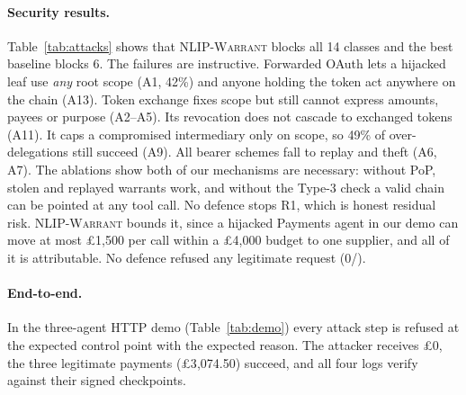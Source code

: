 \documentclass[sigconf,nonacm]{acmart}
\newcommand{\sys}{\textsc{NLIP-Warrant}}
\begin{document}
\paragraph{Security results.} Table~\ref{tab:attacks} shows that \sys{} blocks all 14 classes and the best baseline blocks 6. The failures are instructive. Forwarded OAuth lets a hijacked leaf use \emph{any} root scope (A1, 42\%) and anyone holding the token act anywhere on the chain (A13). Token exchange fixes scope but still cannot express amounts, payees or purpose (A2--A5). Its revocation does not cascade to exchanged tokens (A11). It caps a compromised intermediary only on scope, so 49\% of over-delegations still succeed (A9). All bearer schemes fall to replay and theft (A6, A7). The ablations show both of our mechanisms are necessary: without PoP, stolen and replayed warrants work, and without the Type-3 check a valid chain can be pointed at any tool call. No defence stops R1, which is honest residual risk. \sys{} bounds it, since a hijacked Payments agent in our demo can move at most \pounds1{,}500 per call within a \pounds4{,}000 budget to one supplier, and all of it is attributable. No defence refused any legitimate request (0/\resLegitRequests).

\paragraph{End-to-end.} In the three-agent HTTP demo (Table~\ref{tab:demo}) every attack step is refused at the expected control point with the expected reason. The attacker receives \pounds0, the three legitimate payments (\pounds3{,}074.50) succeed, and all four logs verify against their signed checkpoints.
\end{document}
